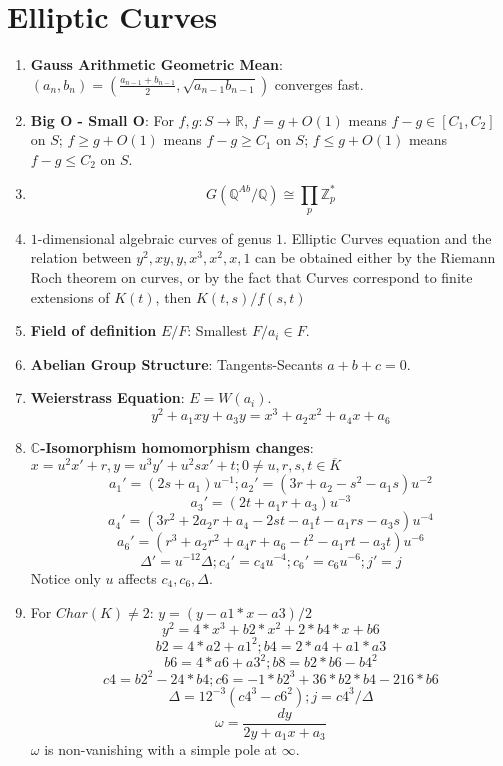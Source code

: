 \documentclass{article}
\newcommand{\Q}{\mathbb{Q}}
\newcommand{\R}{\mathbb{R}}
\newcommand{\C}{\mathbb{C}}
\newcommand{\Z}{\mathbb{Z}}
\newcommand{\ra}{\rightarrow}
\begin{document}
\section{Elliptic Curves}
\begin{multicols}{2}
\begin{enumerate}
\item \textbf{Gauss Arithmetic Geometric Mean}: $(a_n,b_n) = (\frac{a_{n-1}+b_{n-1}}{2}, \sqrt{a_{n-1}b_{n-1}})$ converges fast.

\item \textbf{Big O - Small O}: For $f,g: S \ra \R$, $f = g + O(1)$ means $f-g \in [C_1,C_2]$ on $S$; $f \geq g + O(1)$ means $f-g \geq C_1$ on $S$; $f \leq g + O(1)$ means $f - g \leq C_2$ on $S$.

\item \[G(\Q^{Ab}/\Q) \cong \prod_p \Z_p^*\]

\item $1$-dimensional algebraic curves of genus $1$. Elliptic Curves equation and the relation between $y^2,xy,y,x^3,x^2,x,1$ can be obtained either by the Riemann Roch theorem on curves, or by the fact that Curves correspond to finite extensions of $K(t)$, then $K(t,s)/f(s,t)$

\item \textbf{Field of definition} $E/F$: Smallest $F/ a_i \in F$. 

\item \textbf{Abelian Group Structure}: Tangents-Secants $a + b + c = 0$.

\item \textbf{Weierstrass Equation}: $E = W(a_i)$.
\[y^2 + a_1xy + a_3y = x^3 + a_2x^2 + a_4x + a_6\]

\item \textbf{$\C$-Isomorphism homomorphism changes}: $x = u^2x' + r, y = u^3y' + u^2sx' + t; 0 \neq u,r,s,t \in \overline{K}$
\[a_1'= (2s+a_1)u^{-1}; a_2'= (3r + a_2 -s^2 - a_1s)u^{-2} \]
\[a_3'= (2t + a_1r + a_3)u^{-3} \]
\[a_4'= (3r^2 + 2a_2r + a_4 -2st-a_1t - a_1rs - a_3s)u^{-4} \]
\[a_6'=(r^3 + a_2r^2 + a_4r + a_6 -t^2 -a_1rt- a_3t)u^{-6} \]
\[\Delta' = u^{-12}\Delta; c_4' = c_4u^{-4}; c_6' = c_6u^{-6}; j' = j\]
Notice only $u$ affects $c_4,c_6,\Delta$.

\item For $Char(K) \neq 2$: $y = (y-a1*x-a3)/2$ 
\[ y^2 = 4*x^3 + b2*x^2 + 2*b4*x + b6\]
\[b2 = 4*a2 + a1^2; b4 = 2*a4 + a1*a3\] 
\[b6 = 4*a6+a3^2; b8 = b2*b6-b4^2\]
\[c4 = b2^2 - 24*b4; c6 = -1*b2^3 +36*b2*b4 - 216*b6\]
\[\Delta = 12^{-3}(c4^3-c6^2); j = c4^3/\Delta\]
\[\omega = \frac{dy}{2y + a_1x + a_3}\]
$\omega$ is non-vanishing with a simple pole at $\infty$.  


\end{enumerate}
\end{multicols}
\end{document}
